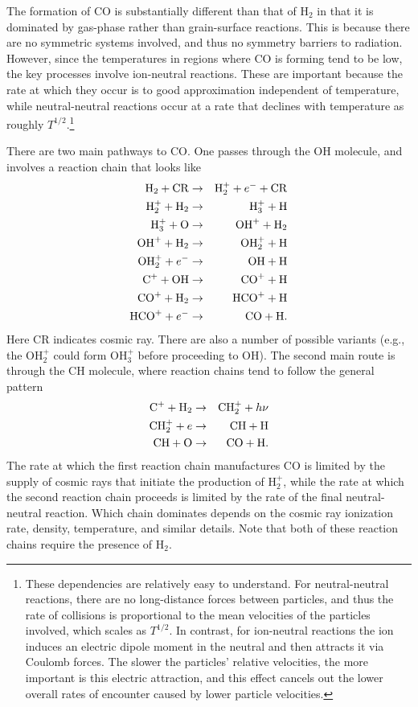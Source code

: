 The formation of CO is substantially different than that of H$_2$ in that it is dominated by gas-phase rather than grain-surface reactions. This is because there are no symmetric systems involved, and thus no symmetry barriers to radiation. However, since the temperatures in regions where CO is forming tend to be low, the key processes involve ion-neutral reactions. These are important because the rate at which they occur is to good approximation independent of temperature, while neutral-neutral reactions occur at a rate that declines with temperature as roughly $T^{1/2}$.\footnote{These dependencies are relatively easy to understand. For neutral-neutral reactions, there are no long-distance forces between particles, and thus the rate of collisions is proportional to the mean velocities of the particles involved, which scales as $T^{1/2}$. In contrast, for ion-neutral reactions the ion induces an electric dipole moment in the neutral and then attracts it via Coulomb forces. The slower the particles' relative velocities, the more important is this electric attraction, and this effect cancels out the lower overall rates of encounter caused by lower particle velocities.}

There are two main pathways to CO. One passes through the OH molecule, and involves a reaction chain that looks like
\begin{eqnarray}
{\rm H}_2 + {\rm CR} & \rightarrow & {\rm H}_2^+ + e^{-} + {\rm CR} \\
{\rm H}_2^+ + {\rm H}_2 & \rightarrow & {\rm H}_3^+ + {\rm H} \\
{\rm H}_3^+ + {\rm O} & \rightarrow & {\rm OH}^+ + {\rm H}_2 \\
{\rm OH}^+ + {\rm H}_2 & \rightarrow & {\rm OH}_2^+ + {\rm H} \\
{\rm OH}_2^+ + e^{-} & \rightarrow & {\rm OH} + {\rm H} \\
{\rm C}^+ + {\rm OH} & \rightarrow & {\rm CO}^+ + {\rm H} \\
{\rm CO}^+ + {\rm H}_2 & \rightarrow & {\rm HCO}^+ + {\rm H} \\
{\rm HCO}^+ + e^{-} & \rightarrow & {\rm CO} + {\rm H}.
\end{eqnarray}
Here CR indicates cosmic ray. There are also a number of possible variants (e.g., the OH$_2^+$ could form OH$_3^+$ before proceeding to OH). The second main route is through the CH molecule, where reaction chains tend to follow the general pattern
\begin{eqnarray}
{\rm C}^+ + {\rm H}_2 & \rightarrow & {\rm CH}_2^+ + h\nu \\
{\rm CH}_2^+ + e & \rightarrow & {\rm CH} + {\rm H} \\
{\rm CH} + {\rm O} & \rightarrow & {\rm CO} + {\rm H}.
\end{eqnarray}
The rate at which the first reaction chain manufactures CO is limited by the supply of cosmic rays that initiate the production of H$_2^+$, while the rate at which the second reaction chain proceeds is limited by the rate of the final neutral-neutral reaction. Which chain dominates depends on the cosmic ray ionization rate, density, temperature, and similar details. Note that both of these reaction chains require the presence of H$_2$. 

